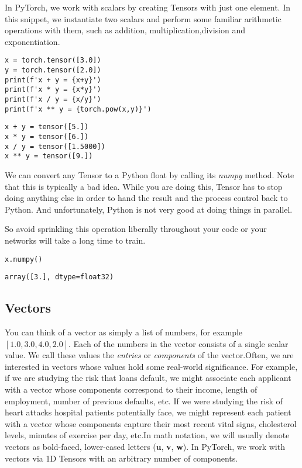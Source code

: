 \documentclass[]{article}
\begin{document}
In PyTorch, we work with scalars by creating Tensors with just one element. In this snippet, we instantiate two scalars and perform some familiar arithmetic operations with them, such as addition, multiplication,division and exponentiation.

\begin{verbatim}
x = torch.tensor([3.0])
y = torch.tensor([2.0])
print(f'x + y = {x+y}')
print(f'x * y = {x*y}')
print(f'x / y = {x/y}')
print(f'x ** y = {torch.pow(x,y)}')
\end{verbatim}

\begin{verbatim}
x + y = tensor([5.])
x * y = tensor([6.])
x / y = tensor([1.5000])
x ** y = tensor([9.])
\end{verbatim}

We can convert any Tensor to a Python float by calling its \textit{numpy} method. Note that this is typically a bad idea. While you are doing this, Tensor has to stop doing anything else in order to hand the result and the process control back to Python. And unfortunately, Python is not very good at doing things in parallel.

So avoid sprinkling this operation liberally throughout your code or your networks will take a long time to train.

\begin{verbatim}
x.numpy()
\end{verbatim}

\begin{verbatim}
array([3.], dtype=float32)
\end{verbatim}

\subsection{Vectors}

You can think of a vector as simply a list of numbers, for example $ [1.0,3.0,4.0,2.0] $. Each of the numbers in the vector consists of a single scalar value. We call these values the \textit{entries} or \textit{components} of the vector.Often, we are interested in vectors whose values hold some real-world significance. For example, if we are studying the risk that loans default, we might associate each applicant with a vector whose components correspond to their income, length of employment, number of previous defaults, etc. If we were studying the risk of heart attacks hospital patients potentially face, we might represent each patient with a vector whose components capture their most recent vital signs, cholesterol levels, minutes of exercise per day, etc.In math notation, we will usually denote vectors as bold-faced, lower-cased letters (\textbf{u}, \textbf{v}, \textbf{w}). In PyTorch, we work with vectors via 1D Tensors with an arbitrary number of components.
\end{document}
